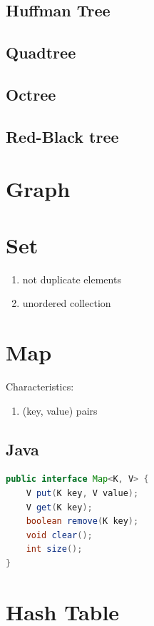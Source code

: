 \documentclass[12pt, a4paper]{report}
\begin{document}
        \subsection{Huffman Tree}
        \subsection{Quadtree}
        \subsection{Octree}
        \subsection{Red-Black tree}
        
    
    \section{Graph}
    
    \section{Set}
   	 \begin{enumerate}
       	 	\item not duplicate elements
        		\item unordered collection
    	\end{enumerate}
    
    \section{Map}
    Characteristics:
    \begin{enumerate}
        \item (key, value) pairs
    \end{enumerate}
        \subsection{Java}
        \begin{lstlisting}[language=Java, caption=Map.java]
public interface Map<K, V> {
    V put(K key, V value);
    V get(K key);
    boolean remove(K key);
    void clear();
    int size();
}
        \end{lstlisting}
    \section{Hash Table}
    
\end{document}
